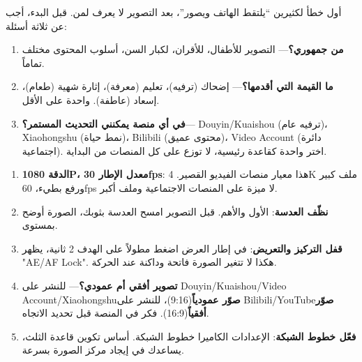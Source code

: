 


أول خطأ لكثيرين “يلتقط الهاتف ويصور”، بعد التصوير لا يعرف لمن. قبل البدء، أجب عن ثلاثة أسئلة:

\begin{enumerate}
  \item \textbf{من جمهوري؟}— التصوير للأطفال، للأقران، لكبار السن، أسلوب المحتوى مختلف تماماً.
  \item \textbf{ما القيمة التي أقدمها؟}— إضحاك (ترفيه)، تعليم (معرفة)، إثارة شهية (طعام)، إسعاد (عاطفة). واحدة على الأقل.
  \item \textbf{في أي منصة يمكنني التحديث المستمر؟}— Douyin/Kuaishou (ترفيه عام)، Xiaohongshu (نمط حياة)، Bilibili (محتوى عميق)، Video Account (دائرة اجتماعية). اختر واحدة كقاعدة رئيسية، لا توزع على كل المنصات من البداية.
\end{enumerate}


\begin{enumerate}
  \item \textbf{الدقة 1080P، معدل الإطار 30fps}: هذا معيار منصات الفيديو القصير. 4K ملف كبير ورفع بطيء، 60fps لا ميزة على المنصات الاجتماعية وملف أكبر.
  \item \textbf{نظّف العدسة}: الأول والأهم. قبل التصوير امسح العدسة بثوبك، الصورة أوضح بمستوى.
  \item \textbf{قفل التركيز والتعريض}: في إطار العرض اضغط مطولاً على الهدف 2 ثانية، يظهر "AE/AF Lock". هكذا لا تتغير الصورة فاتحة وداكنة عند الحركة.
  \item \textbf{تصوير أفقي أم عمودي؟}— للنشر على Douyin/Kuaishou/Video Account/Xiaohongshu\textbf{صوّر عمودياً}(9:16)، للنشر على Bilibili/YouTube\textbf{صوّر أفقياً}(16:9). فكر في المنصة قبل تحديد الاتجاه.
  \item \textbf{فعّل خطوط الشبكة}: الإعدادات الكاميرا خطوط الشبكة. أساس تكوين قاعدة الثلث، يساعدك في إيجاد مركز الصورة بسرعة.
\end{enumerate}


